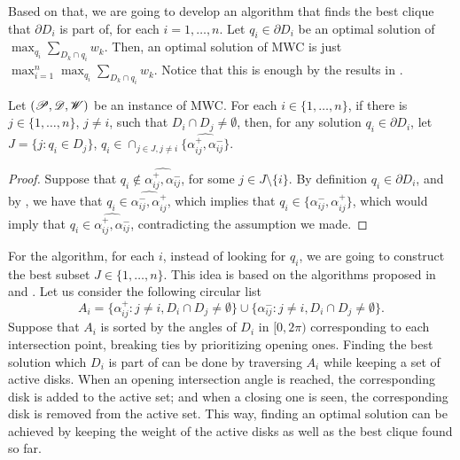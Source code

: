 Based on that, we are going to develop an algorithm that finds the best clique that $\partial D_i$ is part of, for each $i=1, \dots, n$. Let \mbox{$q_i \in \partial D_i$} be an optimal solution of $\max_{q_i} \sum_{D_k \cap q_i} w_k$. Then, an optimal solution of MWC is just
$\max_{i=1}^n \max_{q_i} \sum_{D_k \cap q_i} w_k$. Notice that this is enough by the results in .

\begin{lema}
	Let $(\mathscr{P}, \mathscr{D}, \mathscr{W})$ be an instance of MWC. For each $i\in \{1, \dots, n\}$,
	if there is \mbox{$j \in \{1, \dots, n\}$}, $j\neq i$, such that $D_i \cap D_j \neq \emptyset$, then, for any solution $q_i \in \partial D_i$, let $J=\{j \colon q_i \in D_j\}$,
	$q_i \in \cap_{j \in J, j\neq i}\{\widehat{\alpha_{ij}^+, \alpha_{ij}^-}\}$.
\end{lema}

\begin{proof}
	Suppose that $q_i \not \in \widehat{\alpha_{ij}^+, \alpha_{ij}^-}$, for some $j \in J\setminus \{i\}$.
	By definition $q_i \in \partial D_i$, and by , we have that $q_i \in \widehat{\alpha_{ij}^-, \alpha_{ij}^+}$, which implies that $q_i \in \{\alpha_{ij}^-, \alpha_{ij}^+\}$, which would imply that  $q_i \in \widehat{\alpha_{ij}^+, \alpha_{ij}^-}$, contradicting the assumption we made.
\end{proof}


For the algorithm, for each $i$, instead of looking for $q_i$, we are going to construct the best subset $J \in \{1, \dots, n\}$. This idea is based on the algorithms proposed in  and . Let us consider the following circular list
\begin{equation*}
	A_i = \{\alpha_{ij}^+ \colon j\neq i, D_i \cap D_j \neq \emptyset\} \cup \{\alpha_{ij}^- \colon j\neq i, D_i \cap D_j \neq \emptyset \}.
\end{equation*}
Suppose that $A_i$ is sorted by the angles of $D_i$ in $[0, 2\pi)$ corresponding to each intersection point, breaking ties by prioritizing opening ones.
Finding the best solution which $D_i$ is part of can be done by traversing $A_i$ while keeping a set of active disks. When an opening intersection angle is reached, the corresponding disk is added to the active set; and when a closing one is seen, the corresponding disk is removed from the active set. This way, finding an optimal solution can be achieved by keeping the weight of the active disks as well as the best clique found so far.

